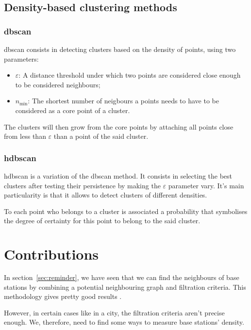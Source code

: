 \documentclass[lettersize,journal,english]{IEEEtran}
\begin{document}
\subsection{Density-based clustering methods}
\subsubsection{\acrshort{dbscan}}
\acrshort{dbscan} consists in detecting clusters based on the density of points, using two parameters:
\begin{itemize}
    \item \emph{$\varepsilon$}: A distance threshold under which two points are considered close enough to be considered neighbours;   
    \item \emph{$n_{\text{min}}$}: The shortest number of neigbours a points needs to have to be considered as a core point of a cluster.
\end{itemize}

The clusters will then \og grow\fg{} from the core points by attaching all points close from less than \emph{$\varepsilon$} than a point of the said 
cluster.

\subsubsection{\acrshort{hdbscan}}
\acrshort{hdbscan} \cite{10.1007/978-3-642-37456-2_14} is a variation of the \acrshort{dbscan} method. It consists
in selecting the best clusters after testing their persistence by making the $\varepsilon$ parameter vary. It's main particularity
is that it allows to detect clusters of different densities.

To each point who belongs to a cluster is associated a probability that symbolises the degree of certainty for this point to belong
to the said cluster.

\section{Contributions}
\noindent In section~\ref{sec:reminder}, we have seen that we can find the neighbours of base stations
by combining a potential neighbouring graph and filtration criteria. This methodology gives pretty good results \cite{art_del_paq}.

However, in certain cases like in a city, the filtration criteria aren't precise enough. We, therefore, need to find some ways to measure base stations' density.
\end{document}

